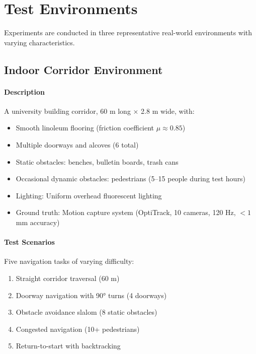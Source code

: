 \section{Test Environments}
\label{sec:test_environments}

Experiments are conducted in three representative real-world environments with varying characteristics.

\subsection{Indoor Corridor Environment}

\paragraph{Description}
A university building corridor, 60 m long × 2.8 m wide, with:
\begin{itemize}
    \item Smooth linoleum flooring (friction coefficient $\mu \approx 0.85$)
    \item Multiple doorways and alcoves (6 total)
    \item Static obstacles: benches, bulletin boards, trash cans
    \item Occasional dynamic obstacles: pedestrians (5--15 people during test hours)
    \item Lighting: Uniform overhead fluorescent lighting
    \item Ground truth: Motion capture system (OptiTrack, 10 cameras, 120 Hz, $< 1$ mm accuracy)
\end{itemize}


\paragraph{Test Scenarios}
Five navigation tasks of varying difficulty:
\begin{enumerate}
    \item Straight corridor traversal (60 m)
    \item Doorway navigation with 90° turns (4 doorways)
    \item Obstacle avoidance slalom (8 static obstacles)
    \item Congested navigation (10+ pedestrians)
    \item Return-to-start with backtracking
\end{enumerate}

